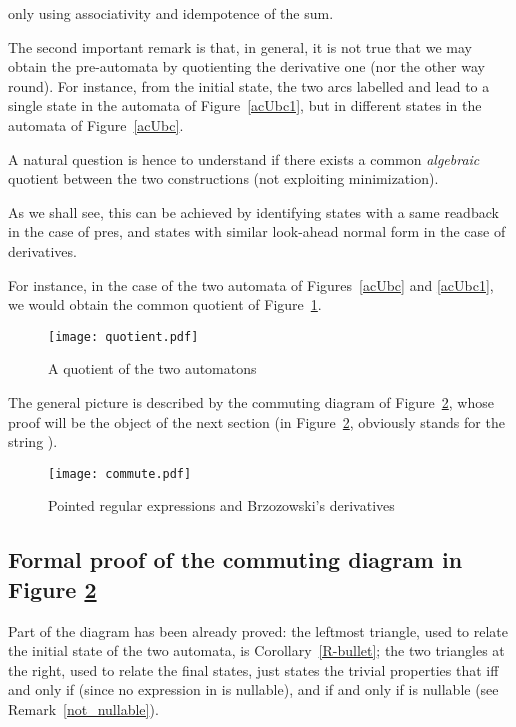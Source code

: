 \documentclass[preprint]{sigplanconf}
\begin{document}
only using associativity and idempotence of the sum.

The second important remark is that, in general, it is not true that we may 
obtain the pre-automata by quotienting the derivative one (nor the other way
round). For instance, from the initial state, the two arcs labelled  and
 lead to a single state in the automata of Figure~\ref{acUbc1}, but in different
states in the automata of Figure~\ref{acUbc}. 

A natural question is hence to
understand if there exists a common {\em algebraic} quotient between the two 
constructions (not exploiting minimization). 

As we shall see, this can be achieved by identifying states with a same
readback in the case of pres, and states with similar look-ahead normal
form in the case of derivatives.

For instance, in the case of the two automata of Figures~\ref{acUbc} and
\ref{acUbc1}, we would obtain the common quotient of Figure~\ref{quotient}.

\begin{figure}[htp]
\begin{center}
\texttt{[image: quotient.pdf]}
\caption{A quotient of the two automatons\label{quotient}}
\end{center}
\end{figure}

The general picture is described by the commuting diagram
of Figure~\ref{commute}, whose proof will be the object of the 
next section (in Figure~\ref{commute},  obviously stands for
the string ).

\begin{figure}[htp]
\begin{center}
\texttt{[image: commute.pdf]}
\caption{Pointed regular expressions and Brzozowski's derivatives\label{commute}}
\end{center}
\end{figure}

\subsection{Formal proof of the commuting diagram in Figure \ref{commute}}

Part of the diagram has been already proved: the leftmost triangle, used to
relate the initial state of the two automata, is
Corollary~\ref{R-bullet}; the two triangles at the right, used to
relate the final states, just states the trivial properties that 
 iff and only if  (since
no expression in  is nullable), and
 if and only if  is nullable (see
Remark~\ref{not_nullable}).
\end{document}
